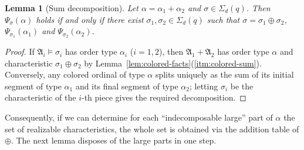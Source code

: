 \documentclass{amsart}
\newtheorem{lemma}{Lemma}
\theoremstyle{definition}
\begin{document}
\begin{lemma}[Sum decomposition]\label{lem:sum-decomposition}
    Let $\alpha = \alpha_1 + \alpha_2$ and $\sigma\in\Sigma_d(q)$. Then $\Psi_\sigma(\alpha)$ holds if and only if there exist $\sigma_1,\sigma_2\in\Sigma_d(q)$ such that $\sigma = \sigma_1 \oplus \sigma_2$, $\Psi_{\sigma_1}(\alpha_1)$ and $\Psi_{\sigma_2}(\alpha_2)$.
\end{lemma}
\begin{proof}
    If $\mathfrak A_i\models\sigma_i$ has order type $\alpha_i$ ($i=1,2$), then $\mathfrak A_1+\mathfrak A_2$ has order type $\alpha$ and characteristic $\sigma_1\oplus\sigma_2$ by Lemma~\ref{lem:colored-facts}(\ref{itm:colored-sum}). Conversely, any colored ordinal of type $\alpha$ splits uniquely as the sum of its initial segment of type $\alpha_1$ and its final segment of type $\alpha_2$; letting $\sigma_i$ be the characteristic of the $i$-th piece gives the required decomposition.
\end{proof}

Consequently, if we can determine for each ``indecomposable large'' part of $\alpha$ the set of realizable characteristics, the whole set is obtained via the addition table of $\oplus$. The next lemma disposes of the large parts in one step.
\end{document}
